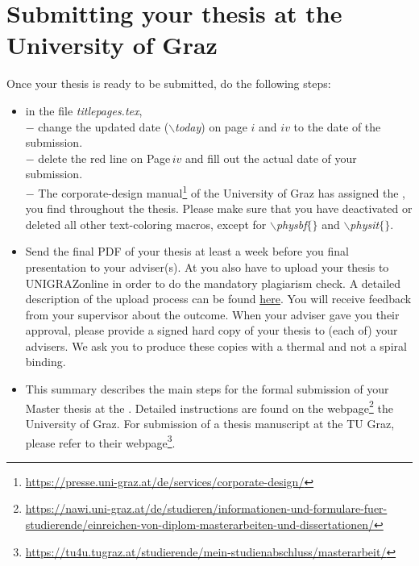 \section*{Submitting your thesis at the University of Graz}
\noindent
Once your thesis is ready to be submitted, do the following steps:
\begin{itemize}
    \item {} in the file  \textit{titlepages.tex}, \\
    $-$ change the updated date ($\backslash$\textit{today}) on page $i$ and $iv$ to the date of the submission.\\
    $-$ delete the red line on Page\,$iv$ and fill out the actual date of your submission.\\
    $-$ The corporate-design manual\footnote{\href{https://presse.uni-graz.at/de/services/corporate-design/}{https://presse.uni-graz.at/de/services/corporate-design/}\label{fn:KFUcorporateDesignManual}} of the University of Graz has assigned the , you find throughout the thesis. Please make sure that you have deactivated or deleted all other text-coloring macros, except for \textit{$\backslash$physbf$\{\}$} and 
    \textit{$\backslash$physit$\{\}$}.
    
    \item {} Send the final PDF of your thesis at least a week before you final presentation to your adviser(s). At  you also have to upload your thesis to UNIGRAZonline in order to do the mandatory plagiarism check. A detailed description of the upload process can be found  \href{https://nawi.uni-graz.at/de/studieren/informationen-und-formulare-fuer-studierende/einreichen-von-bachelorarbeiten/}{here}. You will receive feedback from your supervisor about the outcome. 
    When your adviser gave you their approval, please provide a signed hard copy of your thesis to (each of) your advisers. We ask you to produce these copies with a thermal and not a spiral binding. 
    
    
    
    \item {} This summary describes the main steps for the formal submission of your Master thesis at the .
    Detailed instructions are found on the webpage\footnote{\href{https://nawi.uni-graz.at/de/studieren/informationen-und-formulare-fuer-studierende/einreichen-von-diplom-masterarbeiten-und-dissertationen/}{https://nawi.uni-graz.at/de/studieren/informationen-und-formulare-fuer-studierende/einreichen-von-diplom-masterarbeiten-und-dissertationen/}} the University of Graz.
    For submission of a thesis manuscript at the TU Graz, please refer to their webpage\footnote{ \href{https://tu4u.tugraz.at/studierende/mein-studienabschluss/masterarbeit/}{https://tu4u.tugraz.at/studierende/mein-studienabschluss/masterarbeit/}}.
    

\end{itemize}
